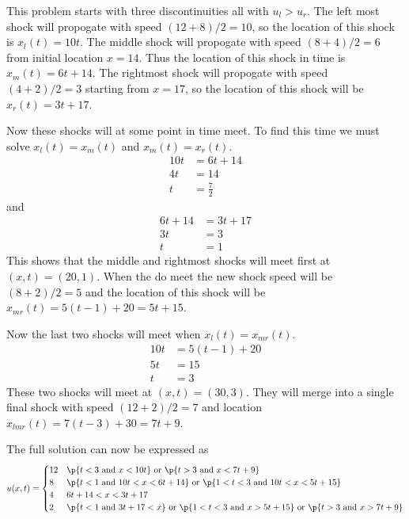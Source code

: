 \documentclass[11pt, oneside]{article}
\begin{document}
\begin{enumerate}
\begin{enumerate}
        This problem starts with three discontinuities all with $u_l > u_r$.
        The left most shock will propogate with speed $(12 + 8)/2 = 10$, so the
        location of this shock is $x_l(t) = 10t$.
        The middle shock will propogate with speed $(8 + 4)/2 = 6$ from initial
        location $x = 14$.
        Thus the location of this shock in time is $x_m(t) = 6t + 14$.
        The rightmost shock will propogate with speed $(4 + 2)/2 = 3$ starting
        from $x = 17$, so the location of this shock will be $x_r(t) = 3t + 17$.

        Now these shocks will at some point in time meet.
        To find this time we must solve $x_l(t) = x_m(t)$ and $x_m(t) = x_r(t)$.
        \begin{align*}
          10t &= 6t + 14 \\
          4t &= 14 \\
          t &= \frac{7}{2}
        \end{align*}
        and
        \begin{align*}
          6t + 14 &= 3t + 17 \\
          3t &= 3 \\
          t &= 1
        \end{align*}
        This shows that the middle and rightmost shocks will meet first at
        $(x, t) = (20, 1)$.
        When the do meet the new shock speed will be $(8 + 2)/2 = 5$ and the
        location of this shock will be $x_{mr}(t) = 5(t - 1) + 20 = 5t + 15$.

        Now the last two shocks will meet when $x_l(t) = x_{mr}(t)$.
        \begin{align*}
          10t &= 5(t - 1) + 20 \\
          5t &= 15 \\
          t & = 3
        \end{align*}
        These two shocks will meet at $(x, t) = (30, 3)$.
        They will merge into a single final shock with speed $(12 + 2)/2 = 7$
        and location $x_{lmr}(t) = 7(t - 3) + 30 = 7t + 9$.

        The full solution can now be expressed as
        \[
          u(x, t) =
          \begin{cases}
            12 & \p{t < 3 \text{ and } x < 10t} \text{ or } \p{t > 3 \text{ and } x < 7t + 9} \\
            8 & \p{t < 1 \text{ and } 10t < x < 6t + 14} \text{ or } \p{1 < t < 3 \text{ and } 10t < x < 5t + 15}  \\
            4 & 6t + 14 < x < 3t + 17 \\
            2 & \p{t < 1 \text{ and } 3t + 17 < x} \text{ or } \p{ 1 < t < 3 \text{ and } x > 5t + 15} \text { or } \p{t > 3 \text{ and } x > 7t + 9}
          \end{cases}
        \]


\end{enumerate}
\end{enumerate}
\end{document}
